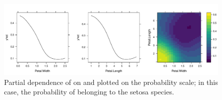 \begin{figure}[!htbp]
  \centering
  \includegraphics[width=1.0\linewidth]{partial_iris_svm_prob}
  \caption{Partial dependence of  on  and  plotted on the probability scale; in this case, the probability of belonging to the setosa species.}
  \label{fig:partial_iris_prob}
\end{figure}

